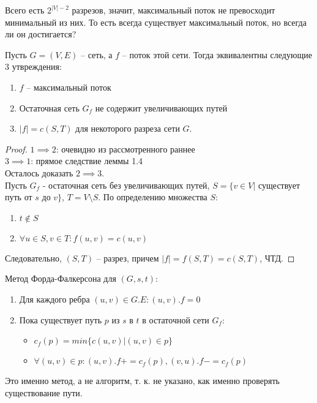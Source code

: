 \noindent Всего есть $2^{|V| - 2}$ разрезов, значит, максимальный поток не превосходит минимальный из них. То есть всегда существует максимальный поток, но всегда ли он достигается?

\begin{theorem}
    Пусть $G = (V, E)$ -- сеть, а $f$ -- поток этой сети. Тогда эквивалентны следующие 3 утвреждения:
    \begin{enumerate}
        \item $f$ -- максимальный поток
        \item Остаточная сеть $G_f$ не содержит увеличивающих путей
        \item $|f| = c(S, T)$ для некоторого разреза сети $G$.
    \end{enumerate}
\end{theorem}

\begin{proof}
    $1 \implies 2$: очевидно из рассмотренного раннее \\ 
    $3 \implies 1$: прямое следствие леммы 1.4 \\
    Осталось доказать $2 \implies 3$. \\
    Пусть $G_f$ - остаточная сеть без увеличивающих путей, $S = \{v \in V | $ существует путь от $s$ до $v\}$, $T = V \setminus S$. По определению множества $S$:
    \begin{enumerate}
        \item $t \notin S$
        \item $\forall u \in S, v \in T: f(u, v) = c(u, v)$
    \end{enumerate}
    Следовательно, $(S, T)$ -- разрез, причем $|f| = f(S, T) = c(S, T)$, ЧТД.
\end{proof}

\noindent Метод Форда-Фалкерсона для $(G, s, t)$:
\begin{enumerate}
    \item Для каждого ребра $(u, v) \in G.E: (u, v).f = 0$
    \item Пока существует путь $p$ из $s$ в $t$ в остаточной сети $G_f$:
    \begin{itemize} 
        \item $c_f(p) = min\{c(u, v) | (u, v) \in p\}$
        \item $\forall (u, v) \in p: (u, v).f += c_f(p), (v, u).f -= c_f(p)$
    \end{itemize}
\end{enumerate}
\noindent Это именно метод, а не алгоритм, т. к. не указано, как именно проверять существование пути.

